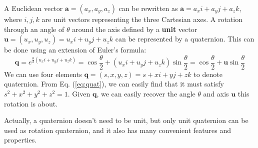 \documentclass[12pt]{article}
\numberwithin{equation}{section}
\begin{document}
A Euclidean vector $\mathbf{a} = (a_x, a_y, a_z)$ can be rewritten as $\mathbf{a} = a_xi + a_yj + a_zk$, where $i, j, k$ are unit vectors representing the three Cartesian axes. A rotation through an angle of $\theta$ around the axis defined by a \textbf{unit} vector $\mathbf{u} = (u_x,u_y,u_z) = u_xi + u_yj + u_zk$ can be represented by a quaternion. This can be done using an extension of Euler's formula:
\begin{equation}
\mathbf{q} = e^{\frac{\theta}{2}(u_xi + u_yj + u_zk)} = \cos\frac{\theta}{2} +(u_xi + u_yj + u_zk) \sin\frac{\theta}{2} = \cos\frac{\theta}{2} + \mathbf{u}\sin\frac{\theta}{2}
\label{eq:quat}
\end{equation}
We can use four elements $\mathbf{q} = (s, x, y, z) = s + xi + yj + zk$ to denote quaternion. From Eq. (\ref{eq:quat}), we can easily find that it must satisfy $s^2 + x^2 + y^2 + z^2 = 1$. Given $\mathbf{q}$, we can easily recover the angle $\theta$ and axis $\mathbf{u}$ this rotation is about.

Actually, a quaternion doesn't need to be unit, but only unit quaternion can be used as rotation quaternion, and it also has many convenient features and properties.
\end{document}
